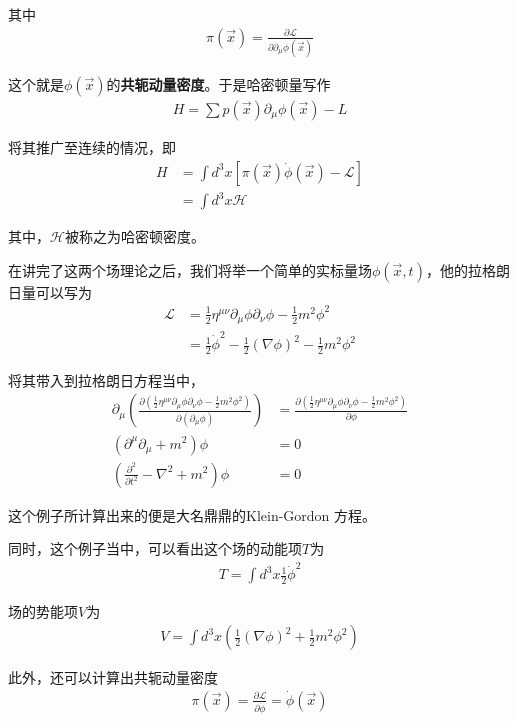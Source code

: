 其中
\begin{align*}
    \pi(\vec{x})=\frac{\partial \mathcal{L}}{\partial \partial_\mu\phi(\vec{x})}
\end{align*}

这个就是$\phi(\vec{x})$的\textbf{共轭动量密度}。于是哈密顿量写作
\begin{align*}
    H=\sum p(\vec{x})\partial_\mu\phi(\vec{x})-L
\end{align*}

将其推广至连续的情况，即
\begin{align*}
    H&=\int d^3x \left[\pi(\vec{x})\dot{\phi}(\vec{x})-\mathcal{L}\right]\\
    &=\int d^3x \mathcal{H}
\end{align*}

其中，$\mathcal{H}$被称之为哈密顿密度。


在讲完了这两个场理论之后，我们将举一个简单的实标量场$\phi(\vec{x},t)$，他的拉格朗日量可以写为
\begin{align*}
    \mathcal{L}&=\frac{1}{2}\eta^{\mu\nu}\partial_\mu\phi\partial_\nu\phi-\frac{1}{2}m^2\phi^2\\
    &=\frac{1}{2}\dot{\phi}^2-\frac{1}{2}(\nabla \phi)^2-\frac{1}{2}m^2\phi^2
\end{align*}

将其带入到拉格朗日方程当中，
\begin{align*}
    \partial_\mu\left(\frac{\partial(\frac{1}{2}\eta^{\mu\nu}\partial_\mu\phi\partial_\nu\phi-\frac{1}{2}m^2\phi^2)}{\partial(\partial_\mu\phi)}\right)&=\frac{\partial(\frac{1}{2}\eta^{\mu\nu}\partial_\mu\phi\partial_\nu\phi-\frac{1}{2}m^2\phi^2)}{\partial \phi}\\
    \left(\partial^\mu\partial_\mu+m^2\right)\phi&=0\\
    \left(\frac{\partial^2}{\partial t^2}-\nabla^2+m^2\right)\phi&=0
\end{align*}

这个例子所计算出来的便是大名鼎鼎的Klein-Gordon 方程。

同时，这个例子当中，可以看出这个场的动能项$T$为
\begin{align*}
    T=\int d^3x\frac{1}{2}\dot{\phi}^2
\end{align*}

场的势能项$V$为
\begin{align*}
    V=\int d^3x \left(\frac{1}{2}(\nabla\phi)^2+\frac{1}{2}m^2\phi^2\right)
\end{align*}

此外，还可以计算出共轭动量密度
\begin{align*}
    \pi(\vec{x})=\frac{\partial\mathcal{L}}{\partial\dot{\phi}}=\dot{\phi}(\vec{x})
\end{align*}

